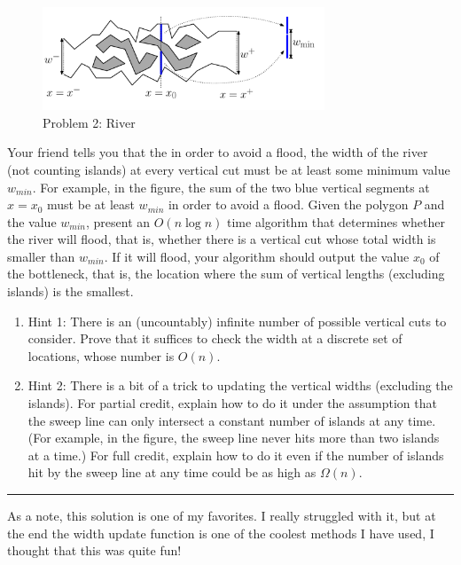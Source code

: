 \documentclass[11pt]{article}
\begin{document}
\begin{figure}[h]
    \centering
    \includegraphics[width=0.75\textwidth]{river}
    \caption{Problem 2: River}
\end{figure}

Your friend tells you that the in order to avoid a flood, the width of the river
(not counting islands) at every vertical cut must be at least some minimum value
$w_{min}$. For example, in the figure, the sum of the two blue vertical segments
at $x = x_0$ must be at least $w_{min}$ in order to avoid a flood.  Given the
polygon $P$ and the value $w_{min}$, present an $O(n \log n)$ time algorithm that
determines whether the river will flood, that is, whether there is a vertical
cut whose total width is smaller than $w_{min}$. If it will flood, your algorithm
should output the value $x_0$ of the bottleneck, that is, the location where the
sum of vertical lengths (excluding islands) is the smallest.

\begin{enumerate}

    \item Hint 1: There is an (uncountably) infinite number of possible vertical
        cuts to consider. Prove that it suffices to check the width at a
        discrete set of locations, whose number is $O(n)$.

    \item Hint 2: There is a bit of a trick to updating the vertical widths
        (excluding the islands). For partial credit, explain how to do it under
        the assumption that the sweep line can only intersect a constant number
        of islands at any time. (For example, in the figure, the sweep line
        never hits more than two islands at a time.) For full credit, explain
        how to do it even if the number of islands hit by the sweep line at any
        time could be as high as $\Omega(n)$.
\end{enumerate}
\hrule

As a note, this solution is one of my favorites. I really struggled with it,
but at the end the width update function is one of the coolest methods I have used,
I thought that this was quite fun!
\end{document}
